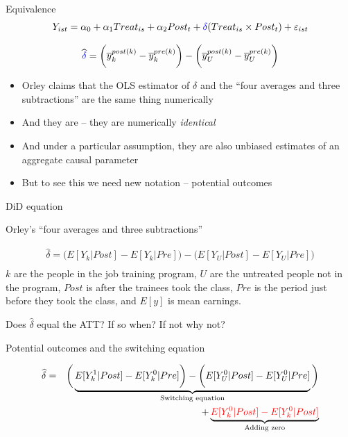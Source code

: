 \documentclass{beamer}
\begin{document}
\begin{frame}{Equivalence}
$$Y_{ist} = \alpha_0 + \alpha_1 Treat_{is} + \alpha_2 Post_{t} + \textcolor{blue}{\delta} (Treat_{is} \times Post_t) + \varepsilon_{ist} $$

\bigskip

$$\widehat{\textcolor{blue}{\delta}} = \bigg ( \overline{y}_k^{post(k)} - \overline{y}_k^{pre(k)} \bigg ) - \bigg ( \overline{y}_U^{post(k)} - \overline{y}_U^{pre(k)} \bigg ) $$

\begin{itemize}
\item Orley claims that the OLS estimator of $\delta$ and the ``four averages and three subtractions'' are the same thing numerically
\item And they are -- they are numerically \emph{identical}
\item And under a particular assumption, they are also unbiased estimates of an aggregate causal parameter
\item But to see this we need new notation -- potential outcomes
\end{itemize}

\end{frame}




\begin{frame}{DiD equation}

Orley's ``four averages and three subtractions''

\begin{eqnarray*}
\widehat{\delta} = \bigg ( E[Y_k|Post] - E[Y_k|Pre] \bigg ) - \bigg ( E[Y_U | Post ] - E[ Y_U | Pre] \bigg) \\
\end{eqnarray*}$k$ are the people in the job training program, $U$ are the untreated people not in the program, $Post$ is after the trainees took the class, $Pre$ is the period just before they took the class, and $E[y]$ is mean earnings. 

\bigskip

Does $\widehat{\delta}$ equal the ATT?  If so when? If not why not?

\end{frame}



\begin{frame}{Potential outcomes and the switching equation}

\begin{eqnarray*}
\widehat{\delta} &=& \bigg ( \underbrace{E[Y^1_k|Post] - E[Y^0_k|Pre] \bigg ) - \bigg ( E[Y^0_U | Post ] - E[ Y^0_U | Pre]}_{\mathclap{\text{Switching equation}}} \bigg)  \\
&&+ \underbrace{\textcolor{red}{E[Y_k^0 |Post] - E[Y^0_k | Post]}}_{\mathclap{\text{Adding zero}}} 
\end{eqnarray*}

\end{frame}
\end{document}
